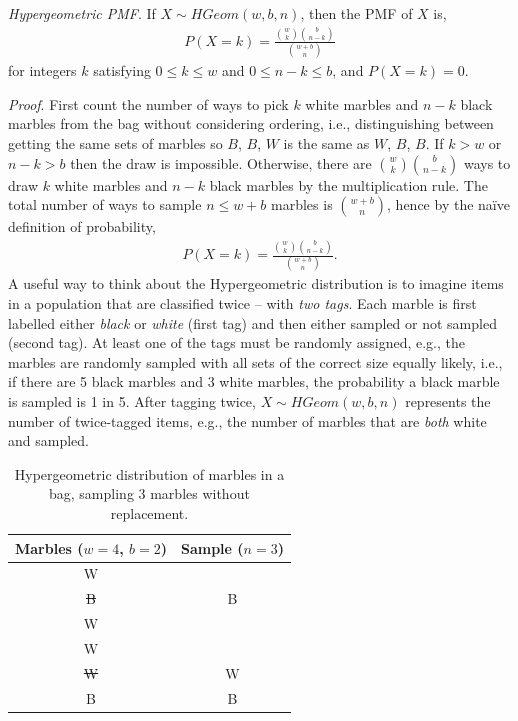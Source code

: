 \emph{Hypergeometric PMF}. 
If \(X \sim HGeom(w,b,n)\), 
then the PMF of \(X\) is,
\begin{align}
P(X = k) = \frac{\binom{w}{k}\binom{b}{n - k}}{\binom{w + b}{n}}
\end{align}
for integers \(k\) satisfying \(0 \leq k \leq w\) and
\(0 \leq n - k \leq b\), and \(P(X = k) = 0\).

\emph{Proof}. 
First count the number of ways to pick \(k\) white marbles
and \(n - k\) black marbles from the bag without considering ordering,
i.e., distinguishing between getting the same sets of marbles so \(B\),
\(B\), \(W\) is the same as \(W\), \(B\), \(B\). 
If \(k > w\) or \(n - k > b\) then the draw is impossible. 
Otherwise, there are
\(\binom{w}{k}\binom{b}{n - k}\) ways to draw \(k\) white marbles and
\(n - k\) black marbles by the multiplication rule. 
The total number of
ways to sample \(n \leq w + b\) marbles is \(\binom{w + b}{n}\), hence
by the naïve definition of probability,
\begin{align}
P(X = k) = \frac{\binom{w}{k}\binom{b}{n - k}}{\binom{w + b}{n}}.
\end{align}
A useful way to think about the Hypergeometric distribution is to
imagine items in a population that are classified twice 
-- with \emph{two tags}. 
Each marble is first labelled either \emph{black} or \emph{white} (first tag) 
and then either sampled or not sampled (second tag). 
At least one of the tags must be randomly assigned, e.g., 
the marbles are randomly sampled with all sets of the correct size equally likely, i.e., 
if there are 5 black marbles and 3 white marbles, 
the probability a black marble is sampled is 1 in 5. 
After tagging twice,
\(X \sim HGeom(w,b,n)\) represents the number of twice-tagged items,
e.g., the number of marbles that are \emph{both} white and sampled.

\begin{table}[h!]
\centering
\begin{tabular}{| c | c |}
\hline
Marbles (\(w=4\), \(b=2\)) & Sample (\(n=3\)) \\\hline
W &  \\\hline
\st{B} & B \\\hline
W &  \\\hline
W &  \\\hline
\st{W} & W \\\hline
B & B \\\hline
\end{tabular}
\caption{%
Hypergeometric distribution of marbles in a bag, 
sampling 3 marbles without replacement.
}
\end{table}

